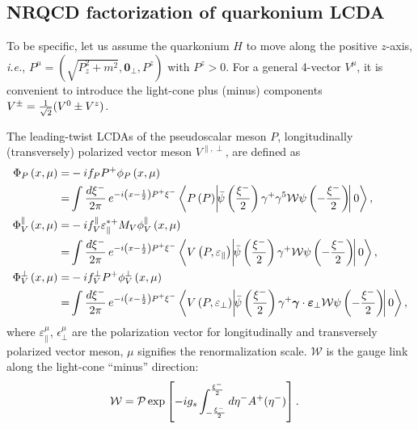 \documentclass[english,preprint,aps,prd,showpacs,superscriptaddress,nofootinbib,tightenlines]{revtex4}
\def\bfgamma{\mbox{\boldmath $\gamma$}}
\def\bfvarepsilon{\mbox{\boldmath $\varepsilon$}}
\begin{document}
\subsection{NRQCD factorization of quarkonium LCDA}

To be specific, let us assume the quarkonium $H$ to move along the positive $z$-axis,
{\it i.e.}, $P^{\mu}=\left(\sqrt{P_z^2+m^{2}},\boldsymbol{0}_{\perp}, P^{z} \right)$ with $P^z>0$.
For a general 4-vector $V^\mu$, it is convenient to introduce the light-cone plus (minus) components
 $V^{\pm}={1\over \sqrt{2}}(V^{0}\pm V^{z})$.

The leading-twist LCDAs of the pseudoscalar meson $P$, longitudinally (transversely) polarized vector meson $V^{\parallel,\perp}$,
are defined as
\begin{subequations}
\begin{align}
\Phi_{P}\left(x,\mu\right)= & -if_{P} P^{+} \phi_{P}\left(x,\mu\right)\nonumber \\
= & \int\frac{d\xi^{-}}{2\pi}\,e^{-i\left(x-\frac{1}{2}\right) P^{+}\xi^{-}}\left\langle P\left(P\right)\!\left|\!\bar{\psi}\left(\frac{\xi^{-}}{2}\right)\gamma^{+}\gamma^{5}\mathcal{W}
\psi\left(-\frac{\xi^{-}}{2}\right)\!\right|0\right\rangle ,\\
\Phi_{V}^{\parallel}\left(x,\mu\right)= & -if_{V}^{\parallel}\varepsilon_{\parallel}^{*+} M_{V} \phi_{V}^{\parallel}\left(x,\mu\right)\nonumber \\
= & \int\frac{d\xi^{-}}{2\pi}\,e^{-i\left(x-\frac{1}{2}\right) P^{+}\xi^{-}}\left\langle V\left(P,\varepsilon_\parallel\right)\!\left|\!\bar{\psi}\left(\frac{\xi^{-}}{2}\right)\gamma^{+}
\mathcal{W} \psi\left(-\frac{\xi^{-}}{2}\right)\!\right|0\right\rangle ,\\
\Phi_{V}^\perp\left(x,\mu\right)= & -i f_{V}^{\perp} P^{+} \phi_{V}^\perp \left(x,\mu\right)
\nonumber \\
= & \int\frac{d\xi^{-}}{2\pi}\,e^{-i\left(x-\frac{1}{2}\right)P^{+}\xi^{-}}\left\langle V\left(P,\varepsilon_\perp \right)\!\left|\!\bar{\psi}\left(\frac{\xi^{-}}{2}\right)\gamma^{+} \bfgamma \cdot \bfvarepsilon_{\perp}
\mathcal{W} \psi\left(-\frac{\xi^{-}}{2}\right)\!\right|0\right\rangle,
\end{align}
\label{eq:LCDA_Def}
\end{subequations}
where $\varepsilon_{\parallel}^{\mu}$,
$\epsilon_{\perp}^{\mu}$ are the polarization vector for longitudinally
and transversely polarized vector meson, $\mu$ signifies the renormalization scale. $\mathcal{W}$ is the gauge
link along the light-cone ``minus'' direction:
\begin{align}
\mathcal{W}  &= {\mathcal P} \exp\left[-i g_s
\int^{\xi^{-}\over 2}_{-{\xi^{-}\over 2}}
d \eta^- A^+(\eta^-)\right].
\end{align}
\end{document}
